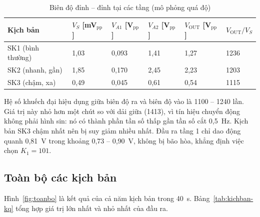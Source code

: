 \begin{table}[!htb]
\centering
\caption{Biên độ đỉnh -- đỉnh tại các tầng (mô phỏng quá độ)}
\label{tab:bientang}
\small
\begin{tabularx}{\textwidth}{@{}p{2.5cm}YYYYY@{}}
\toprule
\textbf{Kịch bản} & $V_S$ [mV$_\text{pp}$] & $V_{A1}$ [V$_\text{pp}$] & $V_{A2}$ [V$_\text{pp}$] & $V_\text{OUT}$ [V$_\text{pp}$] & $V_\text{OUT}/V_S$ \\ \midrule
SK1 (bình thường) & 1,03 & 0,093 & 1,41 & 1,27 & 1236 \\
SK2 (nhanh, gần) & 1,85 & 0,170 & 2,45 & 2,23 & 1203 \\
SK3 (chậm, xa) & 0,49 & 0,045 & 0,61 & 0,54 & 1115 \\
\bottomrule
\end{tabularx}
\end{table}

Hệ số khuếch đại hiệu dụng giữa biên độ ra và biên độ vào là 1100 -- 1240 lần. Giá trị này nhỏ hơn một chút so với dải giữa (1413), vì tín hiệu chuyển động không phải hình sin: nó có thành phần tần số thấp gần tần số cắt 0,5~Hz. Kịch bản SK3 chậm nhất nên bị suy giảm nhiều nhất. Đầu ra tầng 1 chỉ dao động quanh 0,81~V trong khoảng 0,73 -- 0,90~V, không bị bão hòa, khẳng định việc chọn $K_1 = 101$.

\subsection{Toàn bộ các kịch bản}

Hình~\ref{fig:toanbo} là kết quả của cả năm kịch bản trong 40~s. Bảng~\ref{tab:kichban-kq} tổng hợp giá trị lớn nhất và nhỏ nhất của đầu ra.

